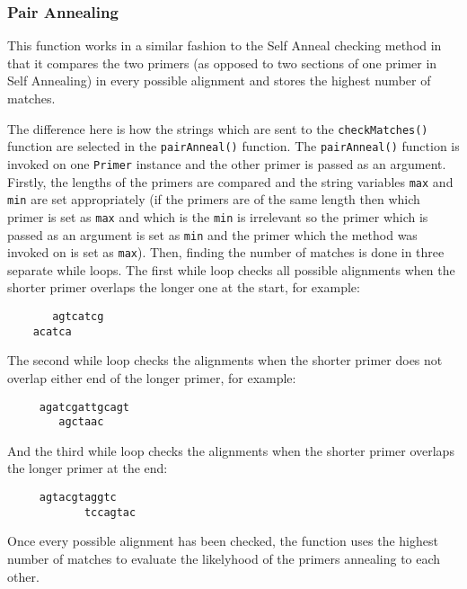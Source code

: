 \subsubsection{Pair Annealing}

This function works in a similar fashion to the Self Anneal checking
method in that it compares the two primers (as opposed to two sections
of one primer in Self Annealing) in every possible alignment and stores
the highest number of matches.

The difference here is how the strings which are sent to the
\texttt{checkMatches()} function are selected in the
\texttt{pairAnneal()} function. The \texttt{pairAnneal()} function is
invoked on one \texttt{Primer} instance and the other primer is passed
as an argument. Firstly, the lengths of the primers are compared and the
string variables \texttt{max} and \texttt{min} are set appropriately (if
the primers are of the same length then which primer is set as
\texttt{max} and which is the \texttt{min} is irrelevant so the primer
which is passed as an argument is set as \texttt{min} and the primer
which the method was invoked on is set as \texttt{max}). Then, finding
the number of matches is done in three separate while loops. The first
while loop checks all possible alignments when the shorter primer
overlaps the longer one at the start, for example:
\begin{verbatim}
       agtcatcg
    acatca
\end{verbatim}
The second while loop checks the alignments when the shorter primer does
not overlap either end of the longer primer, for example:
\begin{verbatim}
     agatcgattgcagt
        agctaac
\end{verbatim}
And the third while loop checks the alignments when the shorter primer
overlaps the longer primer at the end:
\begin{verbatim}
     agtacgtaggtc
            tccagtac
\end{verbatim}
Once every possible alignment has been checked, the function uses the
highest number of matches to evaluate the likelyhood of the primers
annealing to each other.













